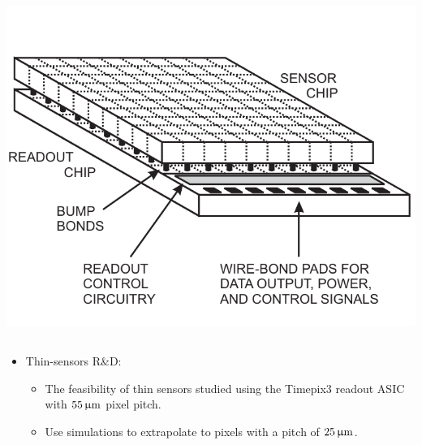 \begin{frame}
\begin{columns}
    \centering
    \includegraphics[width=\textwidth]{figures/hybridDet.pdf}
  \end{columns}

  \begin{itemize}
  \item Thin-sensors R\&D:
    \begin{itemize}
    \item The feasibility of thin sensors studied using the Timepix3
      readout ASIC with \textcolor{Red}{$55\,\upmu\mathrm{m}$} pixel pitch.
    \item Use simulations to extrapolate to pixels with a pitch of
      \textcolor{Red}{$25\,\upmu\mathrm{m}$}.
    \end{itemize}
  \end{itemize}

\end{frame}


